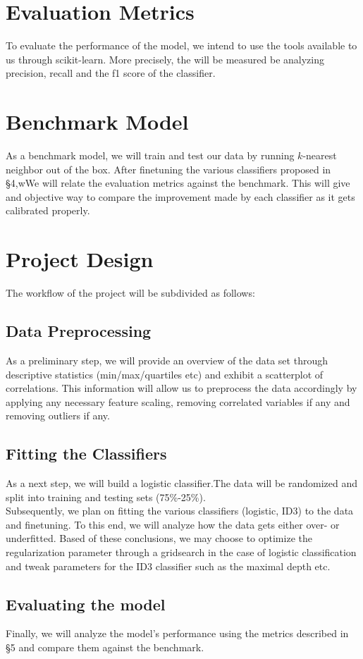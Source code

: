 \documentclass[12pt]{article}
\theoremstyle{plain} \numberwithin{equation}{section}
\theoremstyle{definition}
\begin{document}
\section{Evaluation Metrics}
To evaluate the performance of the model, we intend to use the tools available to us through scikit-learn. More precisely, the will be measured be analyzing precision, recall and the f1 score of the classifier.

\section{Benchmark Model}

As a benchmark model, we will train and test our data by running $k$-nearest neighbor out of the box. After finetuning the various classifiers proposed in \S 4,wWe will relate the evaluation metrics against the benchmark. This will give and objective way to compare the improvement made by each classifier as it gets calibrated properly.\\

\section{Project Design}
The workflow of the project will be subdivided as follows:
\subsection{Data Preprocessing}
As a preliminary step, we will provide an overview of the data set through descriptive statistics (min/max/quartiles etc) and exhibit a scatterplot of correlations. This information will allow us to preprocess the data accordingly by applying any necessary feature scaling, removing correlated variables if any and removing outliers if any.
\subsection{Fitting the Classifiers}
As a next step, we will build a logistic classifier.The data will be randomized and split into training and testing sets (75\%-25\%).\\
Subsequently, we plan on fitting the various classifiers (logistic, ID3) to the data and finetuning. To this end, we will analyze how the data gets either over- or underfitted. Based of these conclusions, we may choose to optimize the regularization parameter through a gridsearch in the case of logistic classification and tweak parameters for the ID3 classifier such as the maximal depth etc. 

\subsection{Evaluating the model} 
Finally, we will analyze the model's performance using the metrics described in  \S 5 and compare them against the benchmark.




\end{document}
